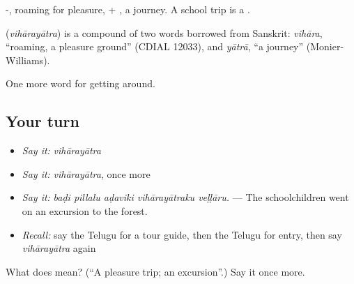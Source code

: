 -, roaming for pleasure, + , a journey. A school trip is a .

\begin{cousinweb}
\textbf{} (\emph{vihārayātra}) is a compound of two words borrowed from Sanskrit: \emph{vihāra}, \textquotedblleft{}roaming, a pleasure ground\textquotedblright{} (CDIAL 12033), and \emph{yātrā}, \textquotedblleft{}a journey\textquotedblright{} (Monier-Williams).
\end{cousinweb}

\begin{grammarlens}[title={What you've built}]
One more word for getting around.
\end{grammarlens}

\subsection*{Your turn}
\begin{itemize}
\raggedright
  \item \emph{Say it:} \emph{vihārayātra}
  \item \emph{Say it:} \emph{vihārayātra}, once more
  \item \emph{Say it:} \emph{baḍi pillalu aḍaviki vihārayātraku veḷḷāru.} — The schoolchildren went on an excursion to the forest.
  \item \emph{Recall:} say the Telugu for a tour guide, then the Telugu for entry, then say \emph{vihārayātra} again
\end{itemize}

\begin{tcolorbox}[breakable,colback=teal!4,colframe=teal!35!black,title={Before you move on}]
What does  mean? (\textquotedblleft{}A pleasure trip; an excursion\textquotedblright{}.) Say it once more.
\end{tcolorbox}

